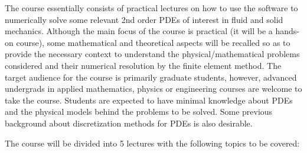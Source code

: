 The course essentially consists of practical lectures on how to use the software to 
numerically solve some relevant 2nd order PDEs of interest in fluid and solid mechanics.  
Although the main focus of the course is practical (it will be a hands-on course), some mathematical and theoretical aspects will be recalled so as to provide the necessary context to understand the physical/mathematical problems considered and their numerical resolution by the finite element method. The target audience for the course is primarily graduate students, however, advanced undergrads in applied mathematics, physics or engineering courses are welcome to take the course. Students are expected to have minimal knowledge about PDEs and the physical models behind the problems to be solved. Some previous background about discretization methods for PDEs is also desirable.

The course will be divided into 5 lectures with the following topics to be covered: 

